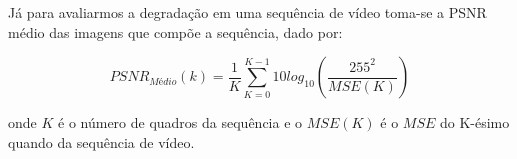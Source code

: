 Já para avaliarmos a degradação em uma sequência de vídeo toma-se a PSNR médio das imagens que compõe a sequência, dado por:
\vspace{-5mm}
\begin{center}
	\begin{equation}
		PSNR_{Médio}(k) = \displaystyle\frac{1}{K}\sum_{K=0}^{K-1} 10log_{10}\left(\frac{255^2}{MSE(K)}\right)
	\end{equation}
\end{center}

\noindent onde $K$ é o número de quadros da sequência e o $MSE(K)$ é o $MSE$ do K-ésimo quando da sequência de vídeo.
